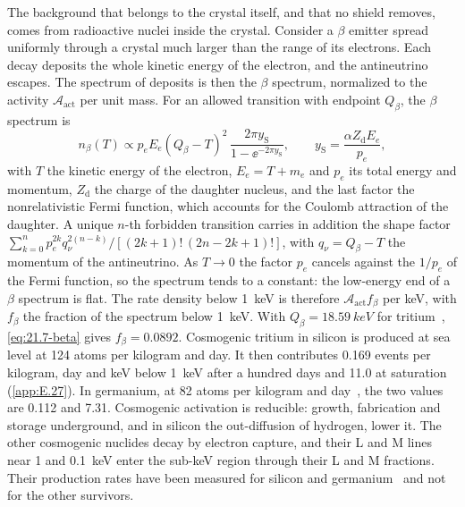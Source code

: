 The background that belongs to the crystal itself, and that no shield removes, comes from radioactive nuclei inside the crystal. Consider a $\beta$ emitter spread uniformly through a crystal much larger than the range of its electrons. Each decay deposits the whole kinetic energy of the electron, and the antineutrino escapes. The spectrum of deposits is then the $\beta$ spectrum, normalized to the activity $\mathcal{A}_{\mathrm{act}}$ per unit mass. For an allowed transition with endpoint $Q_\beta$, the $\beta$ spectrum is
\begin{equation}
  n_\beta(T) \propto p_eE_e(Q_\beta - T)^2\,\frac{2\pi y_{\mathrm{S}}}{1 - \ee^{-2\pi y_{\mathrm{S}}}} , \qquad y_{\mathrm{S}} = \frac{\alpha Z_{\mathrm{d}}E_e}{p_e} ,
  \label{eq:21.7-beta}
\end{equation}
with $T$ the kinetic energy of the electron, $E_e = T + m_e$ and $p_e$ its total energy and momentum, $Z_{\mathrm{d}}$ the charge of the daughter nucleus, and the last factor the nonrelativistic Fermi function, which accounts for the Coulomb attraction of the daughter. A unique $n$-th forbidden transition carries in addition the shape factor $\sum_{k=0}^{n}p_e^{2k}q_\nu^{2(n-k)}/[(2k+1)!\,(2n-2k+1)!]$, with $q_\nu = Q_\beta - T$ the momentum of the antineutrino. As $T \to 0$ the factor $p_e$ cancels against the $1/p_e$ of the Fermi function, so the spectrum tends to a constant: the low-energy end of a $\beta$ spectrum is flat. The rate density below \SI{1}{keV} is therefore $\mathcal{A}_{\mathrm{act}}f_\beta$ per keV, with $f_\beta$ the fraction of the spectrum below \SI{1}{keV}. With $Q_\beta = \SI{18.59}{keV}$ for tritium~\cite{iaea2026livechart}, \cref{eq:21.7-beta} gives $f_\beta = 0.0892$. Cosmogenic tritium in silicon is produced at sea level at 124 atoms per kilogram and day. It then contributes 0.169 events per kilogram, day and keV below \SI{1}{keV} after a hundred days and 11.0 at saturation (\cref{app:E.27}). In germanium, at 82 atoms per kilogram and day~\cite{armengaud2017measurement}, the two values are 0.112 and 7.31. Cosmogenic activation is reducible: growth, fabrication and storage underground, and in silicon the out-diffusion of hydrogen, lower it. The other cosmogenic nuclides decay by electron capture, and their L and M lines near 1 and \SI{0.1}{keV} enter the sub-keV region through their L and M fractions. Their production rates have been measured for silicon and germanium~\cite{saldanha2020cosmogenic,armengaud2017measurement} and not for the other survivors.

